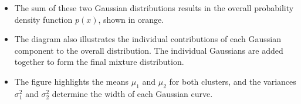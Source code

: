 \begin{example}
\begin{itemize}
        \item The sum of these two Gaussian distributions results in the overall probability density function \( p(x) \), shown in orange.
        
        \item The diagram also illustrates the individual contributions of each Gaussian component to the overall distribution. The individual Gaussians are added together to form the final mixture distribution.
        
        \item The figure highlights the means \( \mu_1 \) and \( \mu_2 \) for both clusters, and the variances \( \sigma_1^2 \) and \( \sigma_2^2 \) determine the width of each Gaussian curve.
        
    \end{itemize}
\end{example}

